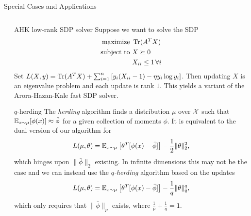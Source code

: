 \documentclass[final]{beamer}
\begin{document}
\begin{frame}{}
\begin{columns}
\begin{column}{0.48\linewidth}
\begin{block}{\large Special Cases and Applications}
\begin{columns}[t]
\begin{column}{0.45\linewidth}
\end{column}
\begin{column}{0.45\linewidth}
\begin{block}{AHK low-rank SDP solver}
Suppose we want to solve the SDP
\begin{align*}
\text{maximize }   & \operatorname{Tr}(A^TX) \\
\text{subject to } & X \succeq 0 \\
                  & X_{ii} \leq 1 \, \forall i
\end{align*}
Set \small{$L(X,y) = \operatorname{Tr}(A^TX) + \sum_{i=1}^n \left[y_i(X_{ii}-1) - \eta y_i\log y_i\right]$}.
Then updating $X$ is an eigenvalue problem and each update is rank $1$. This 
yields a variant of the Arora-Hazan-Kale fast SDP solver.
\end{block}

\begin{block}{$q$-herding}
The \emph{herding} algorithm finds a distribution $\mu$ over 
$\mathcal{X}$ such that $\mathbb{E}_{x \sim \mu}[\phi(x)] \approx \bar{\phi}$ 
for a given collection of moments $\phi$. It is equivalent to 
the dual version of our algorithm for
\[ L(\mu,\theta) = \mathbb{E}_{x \sim \mu}\left[\theta^T[\phi(x)-\bar{\phi}]\right] - \frac{1}{2}\|\theta\|_2^2, \]
which hinges upon $\|\bar{\phi}\|_2$ existing. In infinite 
dimensions this may not be the case and we can instead use the 
\emph{$q$-herding} algorithm based on the updates
\[ L(\mu,\theta) = \mathbb{E}_{x \sim \mu}\left[\theta^T[\phi(x)-\bar{\phi}]\right] - \frac{1}{q}\|\theta\|_q^q, \]
which only requires that $\|\bar{\phi}\|_p$ exists, where $\frac{1}{p} + \frac{1}{q} = 1$.
\end{block}

\end{column}
\end{columns}
\end{block}


\end{column}
\end{columns}
\end{frame}
\end{document}
